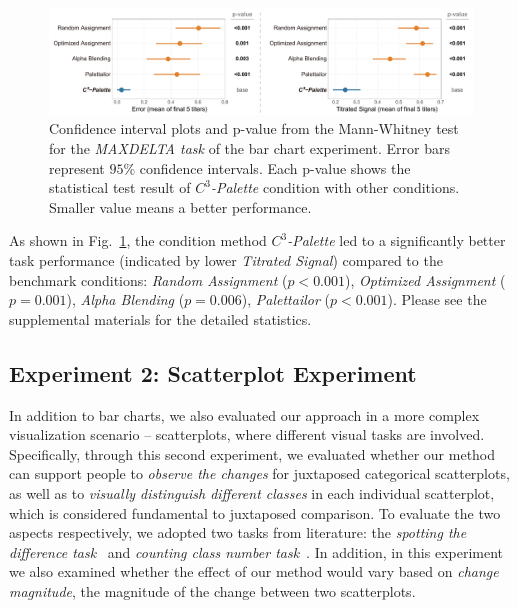 {\begin{figure}[!tb]
\centering
\includegraphics[width=1\linewidth]{figures/maxdelta-results.pdf}
\caption{Confidence interval plots and p-value from the Mann-Whitney test for the \emph{MAXDELTA task} of the bar chart experiment. Error bars represent $95\%$ confidence intervals. Each p-value shows the statistical test result of \emph{$C^3$-Palette} condition with other conditions. Smaller value means a better performance.}
\vspace*{-3mm}
\label{fig:barResults}
\end{figure}
As shown in Fig.~\ref{fig:barResults}, the condition method \emph{$C^3$-Palette} led to a significantly better task performance (indicated by lower \emph{Titrated Signal}) compared to the benchmark conditions: \emph{Random Assignment} ($p<0.001$), \emph{Optimized Assignment} ($p=0.001$), \emph{Alpha Blending} ($p=0.006$), \emph{Palettailor} ($p<0.001$). Please see the supplemental materials for the detailed statistics.




\subsection{Experiment 2: Scatterplot Experiment}
\label{subsec:scatterplotExp}
In addition to bar charts, we also evaluated our approach in a more complex visualization scenario -- scatterplots, where different visual tasks are involved.
Specifically, through this second experiment, we evaluated whether our method can support people to \emph{observe the changes} for juxtaposed categorical scatterplots, as well as to \emph{visually distinguish different classes} in each individual scatterplot, which is considered fundamental to juxtaposed comparison.
To evaluate the two aspects respectively, we adopted two tasks from literature: the \emph{spotting the difference task}~\cite{Fukuba2009} and \emph{counting class number task}~\cite{Lu21}.
In addition, in this experiment we also examined whether the effect of our method would vary based on \emph{change magnitude}, the magnitude of the change between two scatterplots.

}
